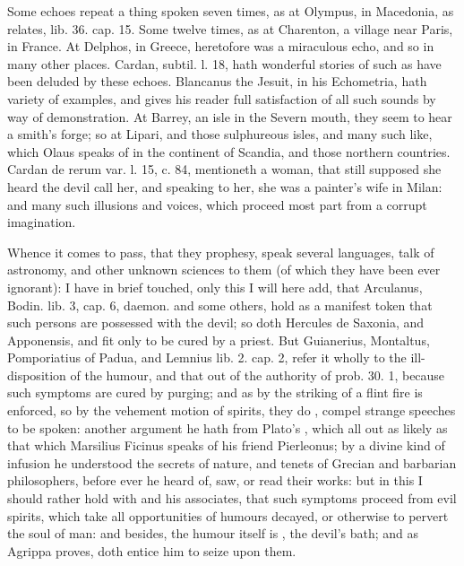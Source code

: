 {Some echoes repeat a thing spoken seven times, as at Olympus, in
Macedonia, as \Pliny{} relates, lib. 36. cap. 15. Some twelve times, as at
Charenton, a village near Paris, in France. At Delphos, in Greece,
heretofore was a miraculous echo, and so in many other places. Cardan,
subtil. l. 18, hath wonderful stories of such as have been deluded by
these echoes. Blancanus the Jesuit, in his Echometria, hath variety of
examples, and gives his reader full satisfaction of all such sounds by
way of demonstration. At Barrey, an isle in the Severn mouth,
they seem to hear a smith's forge; so at Lipari, and those sulphureous
isles, and many such like, which Olaus speaks of in the continent of
Scandia, and those northern countries. Cardan de rerum var. l. 15, c.
84, mentioneth a woman, that still supposed she heard the devil call
her, and speaking to her, she was a painter's wife in Milan: and many
such illusions and voices, which proceed most part from a corrupt
imagination.

Whence it comes to pass, that they prophesy, speak several languages, talk of
astronomy, and other unknown sciences to them (of which they have been ever
ignorant): I have in brief touched, only this I will here
add, that Arculanus, Bodin. lib. 3, cap. 6, daemon. and some others,
 hold as a manifest token that such persons are possessed
with the devil; so doth Hercules de Saxonia, and
Apponensis, and fit only to be cured by a priest. But Guianerius, Montaltus, Pomporiatius
of Padua, and Lemnius lib. 2. cap. 2, refer it wholly to the ill-disposition of
the humour, and that out of the authority of \Aristotle{}
prob. 30. 1, because such symptoms are cured by purging; and as by the striking
of a flint fire is enforced, so by the vehement motion of spirits, they do
, compel strange speeches to be spoken: another argument
he hath from Plato's , which all out as likely as that which
Marsilius Ficinus speaks of his friend Pierleonus; by a
divine kind of infusion he understood the secrets of nature, and tenets of
Grecian and barbarian philosophers, before ever he heard of, saw, or read their
works: but in this I should rather hold with \Avicenna{} and his associates, that
such symptoms proceed from evil spirits, which take all opportunities of
humours decayed, or otherwise to pervert the soul of man: and besides, the
humour itself is , the devil's bath; and as Agrippa proves, doth
entice him to seize upon them.
}
